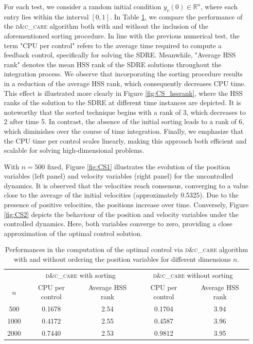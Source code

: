 \documentclass[a4paper,10pt]{article}
\begin{document}
For each test, we consider a random initial condition $y_v(0)\in \mathbb{R}^n$, where each entry lies within the interval $[0,1]$. In Table \ref{table_cucker}, we compare the performance of the \textsc{d\&c\_care} algorithm both with and without the inclusion of the aforementioned sorting procedure. In line with the previous numerical test, the term "CPU per control" refers to the average time required to compute a feedback control, specifically for solving the SDRE. Meanwhile, "Average HSS rank" denotes the mean HSS rank of the SDRE solutions throughout the integration process. We observe that incorporating the sorting procedure results in a reduction of the average HSS rank, which consequently decreases CPU time. This effect is illustrated more clearly in Figure \ref{fig:CS_hssrank}, where the HSS ranks of the solution to the SDRE at different time instances are depicted. It is noteworthy that the sorted technique begins with a rank of 3, which decreases to 2 after time 5. In contrast, the absence of the initial sorting leads to a rank of 6, which diminishes over the course of time integration. Finally, we emphasize that the CPU time per control scales linearly, making this approach both efficient and scalable for solving high-dimensional problems.

With $n=500$ fixed, Figure \ref{fig:CS1} illustrates the evolution of the position variables (left panel) and velocity variables (right panel) for the uncontrolled dynamics. It is observed that the velocities reach consensus, converging to a value close to the average of the initial velocities (approximately 0.5325). Due to the presence of positive velocities, the positions increase over time. Conversely, Figure  \ref{fig:CS2} depicts the behaviour of the position and velocity variables under the controlled dynamics. Here, both variables converge to zero, providing a close approximation of the optimal control solution.

\begin{table}[hbht]
\centering
\begin{tabular}{c|cc|cc}    

        & \multicolumn{2}{c|}{\textsc{d\&c\_care} with sorting} & \multicolumn{2}{c}{\textsc{d\&c\_care} without sorting} \\
$n$   & CPU per control &  Average HSS rank  & CPU per control & Average HSS rank
\\\hline
500    & 0.1678 &     2.54  & 0.1704  & 3.94   \\
1000 & 0.4172    & 2.55  &   0.4587 &  3.96 \\
2000 & 0.7440    & 2.53  &  0.9812  & 3.95 \\ %
 \end{tabular}
  \caption{Performances in the computation of the optimal control via \textsc{d\&c\_care} algorithm with and without ordering the position variables for different dimensions $n$.}
 \label{table_cucker}
\end{table}
\end{document}
